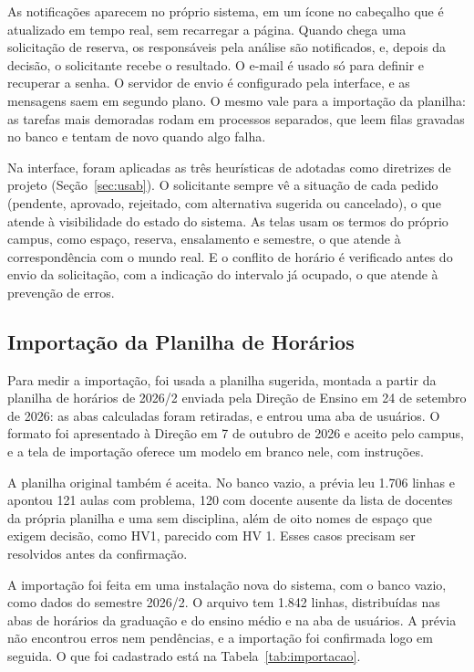 As notificações aparecem no próprio sistema, em um ícone no cabeçalho que é atualizado em tempo real, sem recarregar a página. Quando chega uma solicitação de reserva, os responsáveis pela análise são notificados, e, depois da decisão, o solicitante recebe o resultado. O e-mail é usado só para definir e recuperar a senha. O servidor de envio é configurado pela interface, e as mensagens saem em segundo plano. O mesmo vale para a importação da planilha: as tarefas mais demoradas rodam em processos separados, que leem filas gravadas no banco e tentam de novo quando algo falha.

Na interface, foram aplicadas as três heurísticas de  adotadas como diretrizes de projeto (Seção~\ref{sec:usab}). O solicitante sempre vê a situação de cada pedido (pendente, aprovado, rejeitado, com alternativa sugerida ou cancelado), o que atende à visibilidade do estado do sistema. As telas usam os termos do próprio campus, como espaço, reserva, ensalamento e semestre, o que atende à correspondência com o mundo real. E o conflito de horário é verificado antes do envio da solicitação, com a indicação do intervalo já ocupado, o que atende à prevenção de erros.

\subsection{Importação da Planilha de Horários}
\label{sec:resultado-importacao}

Para medir a importação, foi usada a planilha sugerida, montada a partir da planilha de horários de 2026/2 enviada pela Direção de Ensino em 24 de setembro de 2026: as abas calculadas foram retiradas, e entrou uma aba de usuários. O formato foi apresentado à Direção em 7 de outubro de 2026 e aceito pelo campus, e a tela de importação oferece um modelo em branco nele, com instruções.

A planilha original também é aceita. No banco vazio, a prévia leu 1.706 linhas e apontou 121 aulas com problema, 120 com docente ausente da lista de docentes da própria planilha e uma sem disciplina, além de oito nomes de espaço que exigem decisão, como HV1, parecido com HV 1. Esses casos precisam ser resolvidos antes da confirmação.

A importação foi feita em uma instalação nova do sistema, com o banco vazio, como dados do semestre 2026/2. O arquivo tem 1.842 linhas, distribuídas nas abas de horários da graduação e do ensino médio e na aba de usuários. A prévia não encontrou erros nem pendências, e a importação foi confirmada logo em seguida. O que foi cadastrado está na Tabela~\ref{tab:importacao}.

